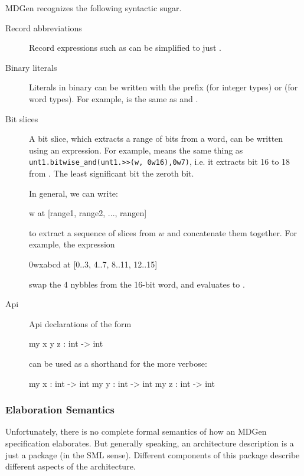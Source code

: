    MDGen recognizes the following syntactic sugar.
\begin{description}
\item[Record abbreviations]
Record expressions such as  
can be simplified to just .
\item[Binary literals]
Literals in binary can be written with the prefix  (for integer types)
or  (for word types).   For example,  is the same 
as  and .
\item[Bit slices]
   A bit slice, which extracts a range of bits from a word, can be written
using an  expression.  For example,  
means the same thing as \verb|unt1.bitwise_and(unt1.>>(w, 0w16),0w7)|, i.e.
it extracts bit 16 to 18 from .  
The least significant bit the zeroth bit. 

In general, we can write:
\begin{SML}
  w at [range1, range2, ..., rangen]
\end{SML}
to extract a sequence of slices from $w$ and concatenate them together.
For example, the expression
\begin{SML}
   0wxabcd at [0..3, 4..7, 8..11, 12..15]
\end{SML}
swap the 4 nybbles from the 16-bit word, and evaluates to .

\item[Api]
Api declarations of the form
\begin{SML}
   my x y z : int -> int
\end{SML}
can be used as a shorthand for the more verbose:
\begin{SML}
   my x : int -> int
   my y : int -> int
   my z : int -> int
\end{SML}
\end{description}

\subsubsection{Elaboration Semantics}

   Unfortunately, there is no complete formal semantics of how
an MDGen specification elaborates.  
   But generally speaking, an architecture description is a just a package 
(in the SML sense).   Different components of this package describe 
different aspects of the architecture.

